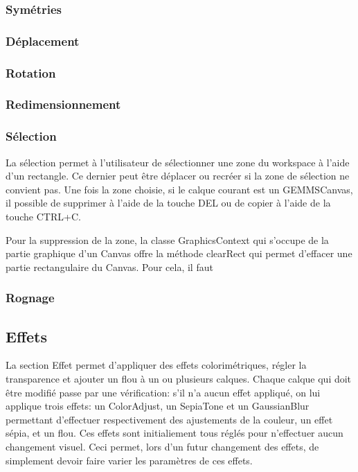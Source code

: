 \subsubsection{Symétries}
\subsubsection{Déplacement}
\subsubsection{Rotation}
\subsubsection{Redimensionnement}
\subsubsection{Sélection}
\label{sec:selection}
La sélection permet à l'utilisateur de sélectionner une zone du workspace à l'aide d'un rectangle. Ce dernier peut être déplacer ou recréer si la zone de sélection ne convient pas. Une fois la zone choisie, si le calque courant est un GEMMSCanvas, il possible de supprimer à l'aide de la touche DEL ou de copier à l'aide de la touche CTRL+C.

Pour la suppression de la zone, la classe GraphicsContext qui s'occupe de la partie graphique d'un Canvas offre la méthode clearRect qui permet d'effacer une partie rectangulaire du Canvas. Pour cela, il faut

\subsubsection{Rognage}
\subsection{Effets}
La section \og Effet \fg{} permet d'appliquer des effets colorimétriques, régler la transparence et ajouter un flou à un ou plusieurs calques. Chaque calque qui doit être modifié passe par une vérification: s'il n'a aucun effet appliqué, on lui applique trois effets: un ColorAdjust, un SepiaTone et un GaussianBlur permettant d'effectuer respectivement des ajustements de la couleur, un effet sépia, et un flou. Ces effets sont initialiement tous réglés pour n'effectuer aucun changement visuel. Ceci permet, lors d'un futur changement des effets, de simplement devoir faire varier les paramètres de ces effets.

